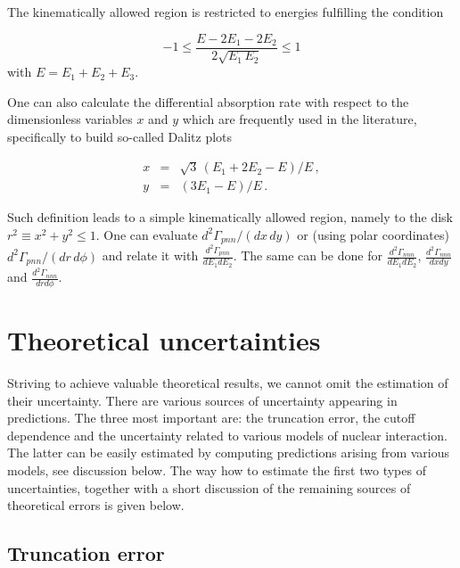     The kinematically allowed region is restricted to energies fulfilling 
    the condition

    \begin{equation}
         -1 \le \frac{E - 2 E_1 - 2 E_2 }{ 2 \sqrt{ E_1 \, E_2} } \le 1
    \end{equation}
    with $E=E_1 + E_2 + E_3$.

    One can also calculate the differential absorption rate with 
    respect to the dimensionless variables $x$ and $y$
    which are frequently used in the literature, specifically to build
    so-called Dalitz plots \cite{Gotta1995}

    \begin{eqnarray}
        x & = & \sqrt{3} \, ( E_1 + 2 E_2 - E ) / E \, , \nonumber \\
        y & = &  ( 3 E_1 - E ) / E \, .
    \label{xy}
    \end{eqnarray}

    Such definition leads to a simple kinematically allowed region, namely to
    the disk $ r^2 \equiv x^2 + y^2 \le 1 $.
    One can evaluate 
    $ {d^2\Gamma_{pnn} }/ \left( {d x \, d y} \right) $
    or (using polar coordinates)
    $ {d^2\Gamma_{pnn} }/ \left( {d r \, d \phi} \right)$
    and relate it with $\frac{d^2\Gamma_{pnn}}{dE_1dE_2}$.
    The same can be done for $\frac{d^2\Gamma_{nnn}}{dE_1dE_2}$,
    $\frac{d^2\Gamma_{nnn}}{dxdy}$ and $\frac{d^2\Gamma_{nnn}}{drd\phi}$.

\section{Theoretical uncertainties}

    Striving to achieve valuable theoretical results, we cannot omit the estimation of their
    uncertainty. There are various sources of uncertainty appearing in predictions.
    The three most important are: the truncation error, the cutoff dependence and
    the uncertainty related to various models of nuclear interaction.
    The latter can be easily estimated by computing predictions arising from various 
    models, see discussion below.
    The way how to estimate the first two types of uncertainties, together with a short
    discussion of the remaining sources of theoretical errors is given below. 

    \subsection*{Truncation error}
    \label{sec:trunc}

